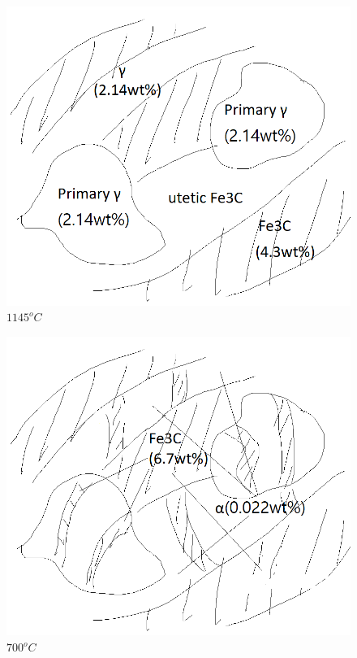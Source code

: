 \documentclass[a4paper]{oblivoir}
\begin{document}
\begin{figure}[htbp]
	\begin{centering}
	\includegraphics[width = 0.75\linewidth]{pro3_2.png}%
	\caption{\label{fig:pro3_2} $1145^{o}C$}
	\end{centering}
\end{figure}
\begin{figure}[htbp]
	\begin{centering}
	\includegraphics[width = 0.75\linewidth]{pro3_3.png}%
	\caption{\label{fig:pro3_3} $700^{o}C$}
	\end{centering}
\end{figure}
\end{document}
